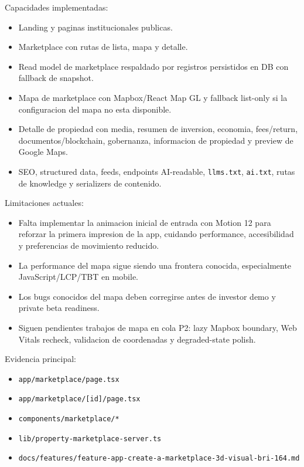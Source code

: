 \documentclass[
  10pt,
  letterpaper,
]{article}
\providecommand{\tightlist}{%
  \setlength{\itemsep}{0pt}\setlength{\parskip}{0pt}}
\let\oldtexttt\texttt
\renewcommand{\texttt}[1]{\oldtexttt{\small #1}}
\begin{document}
Capacidades implementadas:

\begin{itemize}
\tightlist
\item
  Landing y paginas institucionales publicas.
\item
  Marketplace con rutas de lista, mapa y detalle.
\item
  Read model de marketplace respaldado por registros persistidos en DB
  con fallback de snapshot.
\item
  Mapa de marketplace con Mapbox/React Map GL y fallback list-only si la
  configuracion del mapa no esta disponible.
\item
  Detalle de propiedad con media, resumen de inversion, economia,
  fees/return, documentos/blockchain, gobernanza, informacion de
  propiedad y preview de Google Maps.
\item
  SEO, structured data, feeds, endpoints AI-readable, \texttt{llms.txt},
  \texttt{ai.txt}, rutas de knowledge y serializers de contenido.
\end{itemize}

Limitaciones actuales:

\begin{itemize}
\tightlist
\item
  Falta implementar la animacion inicial de entrada con Motion 12 para
  reforzar la primera impresion de la app, cuidando performance,
  accesibilidad y preferencias de movimiento reducido.
\item
  La performance del mapa sigue siendo una frontera conocida,
  especialmente JavaScript/LCP/TBT en mobile.
\item
  Los bugs conocidos del mapa deben corregirse antes de investor demo y
  private beta readiness.
\item
  Siguen pendientes trabajos de mapa en cola P2: lazy Mapbox boundary,
  Web Vitals recheck, validacion de coordenadas y degraded-state polish.
\end{itemize}

Evidencia principal:

\begin{itemize}
\tightlist
\item
  \texttt{app/marketplace/page.tsx}
\item
  \texttt{app/marketplace/{[}id{]}/page.tsx}
\item
  \texttt{components/marketplace/*}
\item
  \texttt{lib/property-marketplace-server.ts}
\item
  \texttt{docs/features/feature-app-create-a-marketplace-3d-visual-bri-164.md}
\end{itemize}
\end{document}
